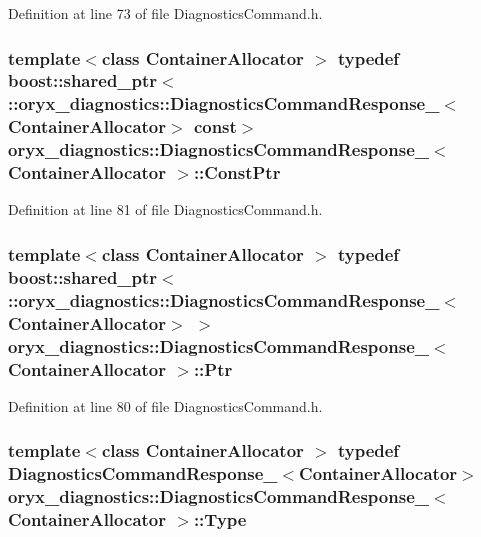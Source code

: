\-Definition at line 73 of file \-Diagnostics\-Command.\-h.

\subsubsection[{\-Const\-Ptr}]{\setlength{\rightskip}{0pt plus 5cm}template$<$class Container\-Allocator $>$ typedef boost\-::shared\-\_\-ptr$<$ \-::{\bf oryx\-\_\-diagnostics\-::\-Diagnostics\-Command\-Response\-\_\-}$<$\-Container\-Allocator$>$ const$>$ {\bf oryx\-\_\-diagnostics\-::\-Diagnostics\-Command\-Response\-\_\-}$<$ \-Container\-Allocator $>$\-::{\bf \-Const\-Ptr}}\label{structoryx__diagnostics_1_1DiagnosticsCommandResponse___aa0b48f64f341f0d71d7f285c2d25b4d7}


\-Definition at line 81 of file \-Diagnostics\-Command.\-h.

\subsubsection[{\-Ptr}]{\setlength{\rightskip}{0pt plus 5cm}template$<$class Container\-Allocator $>$ typedef boost\-::shared\-\_\-ptr$<$ \-::{\bf oryx\-\_\-diagnostics\-::\-Diagnostics\-Command\-Response\-\_\-}$<$\-Container\-Allocator$>$ $>$ {\bf oryx\-\_\-diagnostics\-::\-Diagnostics\-Command\-Response\-\_\-}$<$ \-Container\-Allocator $>$\-::{\bf \-Ptr}}\label{structoryx__diagnostics_1_1DiagnosticsCommandResponse___af16a9cbcd3a744cbc380e4ef322cc8f0}


\-Definition at line 80 of file \-Diagnostics\-Command.\-h.

\subsubsection[{\-Type}]{\setlength{\rightskip}{0pt plus 5cm}template$<$class Container\-Allocator $>$ typedef {\bf \-Diagnostics\-Command\-Response\-\_\-}$<$\-Container\-Allocator$>$ {\bf oryx\-\_\-diagnostics\-::\-Diagnostics\-Command\-Response\-\_\-}$<$ \-Container\-Allocator $>$\-::{\bf \-Type}}\label{structoryx__diagnostics_1_1DiagnosticsCommandResponse___a0615eceb5d91933952d6f6adbf87d10e}


